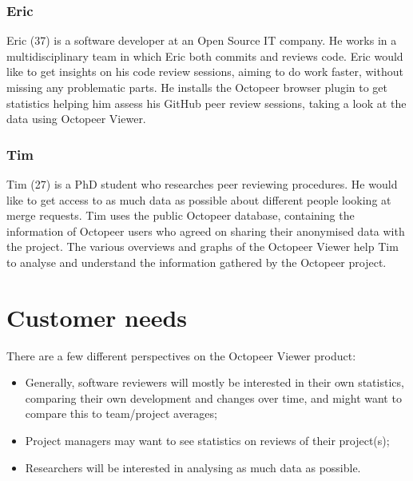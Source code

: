 \documentclass{article}
\begin{document}
\subsubsection{Eric}
Eric (37) is a software developer at an Open Source IT company. He works in a multidisciplinary team in which Eric both commits and reviews code. Eric would like to get insights on his code review sessions, aiming to do work faster, without missing any problematic parts. He installs the Octopeer browser plugin to get statistics helping him assess his GitHub peer review sessions, taking a look at the data using Octopeer Viewer.

\subsubsection{Tim}
Tim (27) is a PhD student who researches peer reviewing procedures. He would like to get access to as much data as possible about different people looking at merge requests. Tim uses the public Octopeer database, containing the information of Octopeer users who agreed on sharing their anonymised data with the project. The various overviews and graphs of the Octopeer Viewer help Tim to analyse and understand the information gathered by the Octopeer project.

\section{Customer needs}
There are a few different perspectives on the Octopeer Viewer product:
\begin{itemize}
\item Generally, software reviewers will mostly be interested in their own statistics, comparing their own development and changes over time, and might want to compare this to team/project averages;
\item Project managers may want to see statistics on reviews of their project(s);
\item Researchers will be interested in analysing as much data as possible.
\end{itemize}
\end{document}
